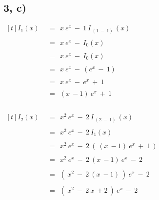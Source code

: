 \subsection*{3, c)}
	
	$\begin{aligned}[t]
	I_1(x) ~~ &= ~~ x ~ e^x ~ - ~ 1 ~ I_{~ (1 ~ - ~ 1) ~}(x) \\ \\
	&= ~~ x ~ e^x ~ - ~ I_{0}(x) \\ \\
	&= ~~ x ~ e^x ~ - ~ I_{0}(x) \\ \\
	&= ~~ x ~ e^x ~ - ~ \left( e^x ~ - ~ 1 \right) \\ \\
	&= ~~ x ~ e^x ~ - ~ e^x ~ + ~ 1 \\ \\
	&= ~~ \left( x ~ - 1 \right) ~ e^x ~ + ~ 1 \\ \\
	\end{aligned}$
	
	\newpage
	
	$\begin{aligned}[t]
	I_2(x) ~~ &= ~~ x^2 ~ e^x ~ - ~ 2 ~ I_{~ (2 ~ - ~ 1) ~}(x) \\ \\
	&= ~~ x^2 ~ e^x ~ - ~ 2 ~ I_{1}(x) \\ \\
	&= ~~ x^2 ~ e^x ~ - ~ 2 ~ \left( ~ \left( x ~ - 1 \right) ~ e^x ~ + ~ 1 ~ \right) \\ \\
	&= ~~ x^2 ~ e^x ~ - ~ 2 ~  \left( x ~ - 1 \right) ~ e^x ~ - ~ 2 \\ \\
	&= ~~ \left( ~ x^2 ~ - ~ 2 ~ \left( x ~ - 1 \right) ~ \right) ~ e^x ~ - ~ 2 \\ \\
	&= ~~ \left( ~ x^2 ~ - ~ 2 ~ x ~ + 2 ~ \right) ~ e^x ~ - ~ 2 \\ \\
	\end{aligned}$ \\
	
	~\\
	
